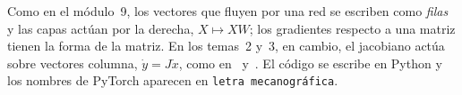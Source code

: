\documentclass[11pt,a4paper,twoside,openany]{book}
\begin{document}
Como en el módulo~9, los vectores que fluyen por una red se escriben como \emph{filas} y las capas actúan por la derecha, $X\mapsto XW$; los gradientes respecto a una matriz tienen la forma de la matriz. En los temas~2 y~3, en cambio, el jacobiano actúa sobre vectores columna, $\dot y=J\dot x$, como en~\cite{baydin} y~\cite{gw}. El código se escribe en Python y los nombres de PyTorch aparecen en \texttt{letra mecanográfica}.

\tableofcontents

\mainmatter







\appendix


\backmatter

\end{document}
